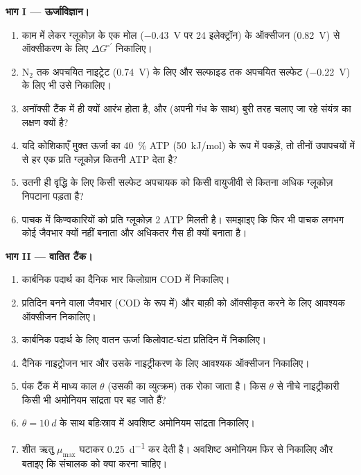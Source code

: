 \begin{problem}
\medskip
\noindent\textbf{भाग I --- ऊर्जाविज्ञान।}
\begin{enumerate}
  \item {} काम में लेकर ग्लूकोज़ के एक मोल
        (\qty{-0.43}{V} पर 24 इलेक्ट्रॉन) के ऑक्सीजन (\qty{+0.82}{V})
        से ऑक्सीकरण के लिए $\Delta G^{\circ\prime}$ निकालिए।
  \item $\mathrm{N_2}$ तक अपचयित नाइट्रेट (\qty{+0.74}{V}) के लिए और
        सल्फाइड तक अपचयित सल्फेट (\qty{-0.22}{V}) के लिए भी उसे
        निकालिए।
  \item {} अनॉक्सी टैंक में ही क्यों आरंभ होता है, और
         (अपनी गंध के साथ) बुरी तरह चलाए जा रहे
        संयंत्र का लक्षण क्यों है?
  \item यदि कोशिकाएँ मुक्त ऊर्जा का \qty{40}{\%} ATP
        (\qty{50}{kJ/mol}) के रूप में पकड़ें, तो तीनों उपापचयों में से
        हर एक प्रति ग्लूकोज़ कितनी ATP देता है?
  \item उतनी ही वृद्धि के लिए किसी सल्फेट अपचायक को किसी वायुजीवी से
        कितना अधिक ग्लूकोज़ निपटाना पड़ता है?
  \item पाचक में किण्वकारियों को प्रति ग्लूकोज़ 2 ATP मिलती है।
        समझाइए कि फिर भी पाचक लगभग कोई जैवभार क्यों नहीं बनाता और
        अधिकतर गैस ही क्यों बनाता है।
\end{enumerate}

\medskip
\noindent\textbf{भाग II --- वातित टैंक।}
\begin{enumerate}[resume]
  \item कार्बनिक पदार्थ का दैनिक भार किलोग्राम COD में निकालिए।
  \item प्रतिदिन बनने वाला जैवभार (COD के रूप में) और बाक़ी को ऑक्सीकृत
        करने के लिए आवश्यक ऑक्सीजन निकालिए।
  \item कार्बनिक पदार्थ के लिए वातन ऊर्जा किलोवाट-घंटा प्रतिदिन में
        निकालिए।
  \item दैनिक नाइट्रोजन भार और उसके नाइट्रीकरण के लिए आवश्यक ऑक्सीजन
        निकालिए।
  \item पंक टैंक में माध्य काल $\theta$ (उसकी  का
        व्युत्क्रम) तक रोका जाता है। किस $\theta$ से नीचे नाइट्रीकारी
        किसी भी अमोनियम सांद्रता पर बह जाते हैं?
  \item $\theta = \qty{10}{d}$ के साथ बहिःस्राव में अवशिष्ट अमोनियम
        सांद्रता निकालिए।
  \item शीत ऋतु $\mu_{\max}$ घटाकर \qty{0.25}{d^{-1}} कर देती है।
        अवशिष्ट अमोनियम फिर से निकालिए और बताइए कि संचालक को क्या
        करना चाहिए।
\end{enumerate}


\end{problem}
